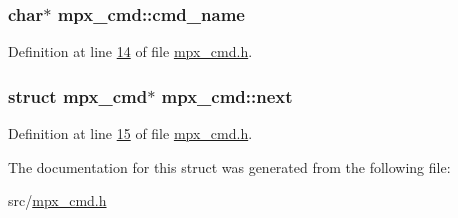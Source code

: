 \hypertarget{structmpx__cmd_aeae73296151ffcec319820f4d8399e51}{
\subsubsection[{cmd\_\-name}]{\setlength{\rightskip}{0pt plus 5cm}char$\ast$ {\bf mpx\_\-cmd::cmd\_\-name}}}
\label{structmpx__cmd_aeae73296151ffcec319820f4d8399e51}


Definition at line \hyperlink{mpx__cmd_8h_source_l00014}{14} of file \hyperlink{mpx__cmd_8h_source}{mpx\_\-cmd.h}.

\hypertarget{structmpx__cmd_a863c991d0d31b283791615b5f5fe03bb}{
\subsubsection[{next}]{\setlength{\rightskip}{0pt plus 5cm}struct {\bf mpx\_\-cmd}$\ast$ {\bf mpx\_\-cmd::next}}}
\label{structmpx__cmd_a863c991d0d31b283791615b5f5fe03bb}


Definition at line \hyperlink{mpx__cmd_8h_source_l00015}{15} of file \hyperlink{mpx__cmd_8h_source}{mpx\_\-cmd.h}.



The documentation for this struct was generated from the following file:\begin{DoxyCompactItemize}
\item 
src/\hyperlink{mpx__cmd_8h}{mpx\_\-cmd.h}\end{DoxyCompactItemize}
